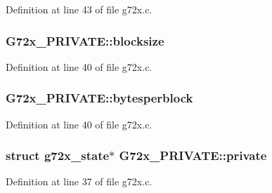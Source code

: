 Definition at line 43 of file g72x.\+c.

\subsubsection[{\texorpdfstring{blocksize}{blocksize}}]{ G72x\+\_\+\+P\+R\+I\+V\+A\+T\+E\+::blocksize}\hypertarget{struct_g72x___p_r_i_v_a_t_e_afc4e3f647aa96c0adf9c47d3175112c8}{}\label{struct_g72x___p_r_i_v_a_t_e_afc4e3f647aa96c0adf9c47d3175112c8}


Definition at line 40 of file g72x.\+c.

\subsubsection[{\texorpdfstring{bytesperblock}{bytesperblock}}]{ G72x\+\_\+\+P\+R\+I\+V\+A\+T\+E\+::bytesperblock}\hypertarget{struct_g72x___p_r_i_v_a_t_e_a2356cb08ae055a24d8c487f979ab16dc}{}\label{struct_g72x___p_r_i_v_a_t_e_a2356cb08ae055a24d8c487f979ab16dc}


Definition at line 40 of file g72x.\+c.

\subsubsection[{\texorpdfstring{private}{private}}]{\setlength{\rightskip}{0pt plus 5cm}struct {\bf g72x\+\_\+state}$\ast$ G72x\+\_\+\+P\+R\+I\+V\+A\+T\+E\+::private}\hypertarget{struct_g72x___p_r_i_v_a_t_e_aba551111945bdb20e43779ce1efc5454}{}\label{struct_g72x___p_r_i_v_a_t_e_aba551111945bdb20e43779ce1efc5454}


Definition at line 37 of file g72x.\+c.

